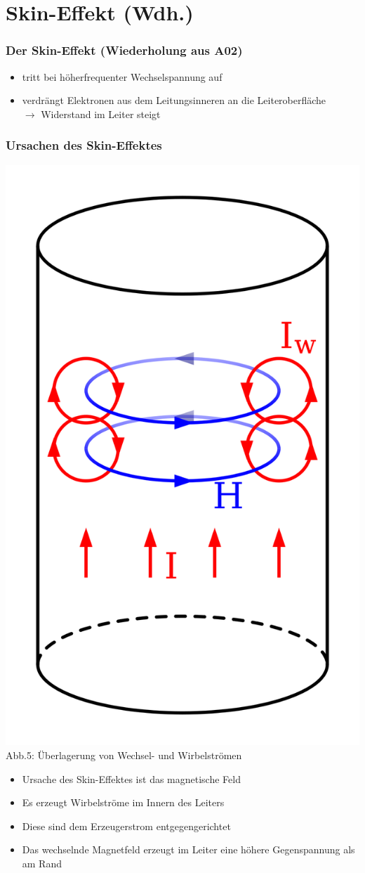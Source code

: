 \section*{Skin-Effekt (Wdh.)}
\begin{frame}
  \frametitle{Der Skin-Effekt (Wiederholung aus A02)}
  \begin{itemize}
    \item tritt bei höherfrequenter Wechselspannung auf
    \item verdrängt Elektronen aus dem Leitungsinneren an die Leiteroberfläche \\
          $\rightarrow$ Widerstand im Leiter steigt
  \end{itemize}
\end{frame}

\begin{frame}
  \frametitle{Ursachen des Skin-Effektes}
  \begin{center}
    \includegraphics[width=.4\textwidth,height=.35\textheight,keepaspectratio]{a02/Skineffect.png}\\
    {\tiny Abb.5: Überlagerung von Wechsel- und Wirbelströmen \cite{wp}}
    \begin{itemize}
      \item Ursache des Skin-Effektes ist das magnetische Feld
      \item Es erzeugt Wirbelströme im Innern des Leiters
      \item Diese sind dem Erzeugerstrom entgegengerichtet
      \item Das wechselnde Magnetfeld erzeugt im Leiter eine höhere Gegenspannung als am Rand
    \end{itemize}
  \end{center}
\end{frame}


